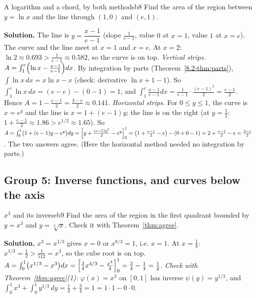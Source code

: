 \documentclass[11pt]{article}
\begin{document}
\begin{exmp}{A logarithm and a chord, by both methods}{b8}
Find the area of the region between $y=\ln x$ and the line through $(1,0)$ and $(e,1)$.

\textbf{Solution.} The line is $y=\dfrac{x-1}{e-1}$ (slope $\frac1{e-1}$, value $0$ at $x=1$, value $1$ at $x=e$). The curve and the line meet at $x=1$ and $x=e$. At $x=2$: $\ln2\approx0.693>\frac1{e-1}\approx0.582$, so the curve is on top.
\emph{Vertical strips.} $A=\int_1^e\Bigl(\ln x-\frac{x-1}{e-1}\Bigr)dx$. By integration by parts (Theorem~\ref{8.2-thm:parts}), $\int\ln x\,dx=x\ln x-x$ (check: derivative $\ln x+1-1$). So $\int_1^e\ln x\,dx=(e-e)-(0-1)=1$, and $\int_1^e\frac{x-1}{e-1}dx=\frac1{e-1}\cdot\frac{(e-1)^2}2=\frac{e-1}2$. Hence $A=1-\frac{e-1}2=\frac{3-e}2\approx0.141$.
\emph{Horizontal strips.} For $0\le y\le1$, the curve is $x=e^y$ and the line is $x=1+(e-1)y$; the line is on the right (at $y=\frac12$: $1+\frac{e-1}2\approx1.86>e^{1/2}\approx1.65$). So $A=\int_0^1\bigl(1+(e-1)y-e^y\bigr)dy=\Bigl[y+\frac{(e-1)y^2}2-e^y\Bigr]_0^1=\left(1+\frac{e-1}2-e\right)-(0+0-1)=2+\frac{e-1}2-e=\frac{3-e}2$.
The two answers agree. (Here the horizontal method needed no integration by parts.)
\end{exmp}

\subsection*{Group 5: Inverse functions, and curves below the axis}

\begin{exmp}{$x^3$ and its inverse}{b9}
Find the area of the region in the first quadrant bounded by $y=x^3$ and $y=\sqrt[3]x$. Check it with Theorem~\ref{thm:agree}.

\textbf{Solution.} $x^3=x^{1/3}$ gives $x=0$ or $x^{8/3}=1$, i.e. $x=1$. At $x=\frac18$: $x^{1/3}=\frac12>\frac1{512}=x^3$, so the cube root is on top. $A=\int_0^1\bigl(x^{1/3}-x^3\bigr)dx=\Bigl[\frac34x^{4/3}-\frac{x^4}4\Bigr]_0^1=\frac34-\frac14=\frac12$.
\emph{Check with Theorem~\ref{thm:agree}(1):} $\varphi(x)=x^3$ on $[0,1]$ has inverse $\psi(y)=y^{1/3}$, and $\int_0^1x^3+\int_0^1y^{1/3}\,dy=\frac14+\frac34=1=1\cdot1-0\cdot0$. \checkmark
\end{exmp}
\end{document}
